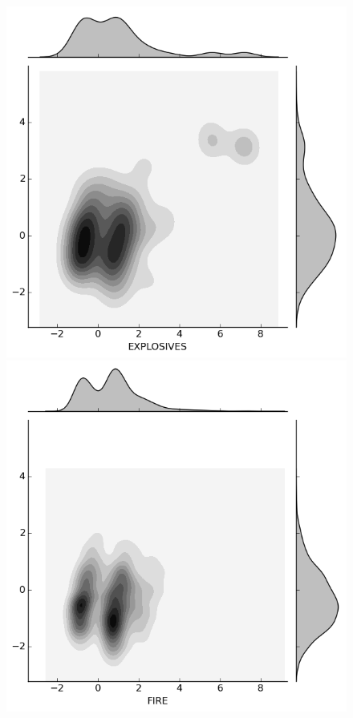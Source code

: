 \documentclass{evanarticle}
\begin{document}
\begin{figure}[H]
  \begin{minipage}[b]{0.20\linewidth}
    \includegraphics[width=\linewidth]{images/weapon/EXPLOSIVES.png}
  \end{minipage}
  \quad
  \begin{minipage}[b]{0.20\linewidth}
    \includegraphics[width=\linewidth]{images/weapon/FIRE.png}

\end{minipage}
\end{figure}
\end{document}
